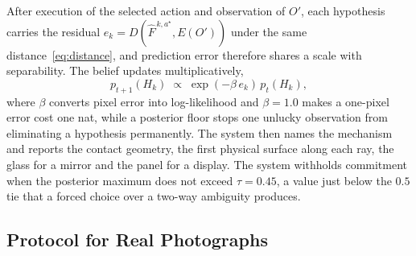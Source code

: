 \documentclass{article} %
\theoremstyle{defstyle}
\theoremstyle{plain}
\begin{document}
After execution of the selected action and observation of $O'$, each hypothesis carries the
residual $e_k = D(\hat{F}^{\,k,a^\star}, E(O'))$ under the same
distance~\eqref{eq:distance}, and prediction error therefore shares a scale with
separability. The belief updates multiplicatively,
\begin{equation}
\label{eq:belief}
p_{t+1}(H_k) \;\propto\; \exp\!\left(-\beta\, e_k\right)\, p_t(H_k),
\end{equation}
where $\beta$ converts pixel error into log-likelihood and $\beta = 1.0$ makes a one-pixel
error cost one nat, while a posterior floor stops one unlucky observation from eliminating
a hypothesis permanently. The system then names the mechanism and reports the contact
geometry, the first physical surface along each ray, the glass for a mirror and the panel
for a display. The system withholds commitment when the posterior maximum does not exceed
$\tau = 0.45$, a value just below the $0.5$ tie that a forced choice over a two-way
ambiguity produces.

\subsection{Protocol for Real Photographs}
\label{sec:real-protocol}
\end{document}
